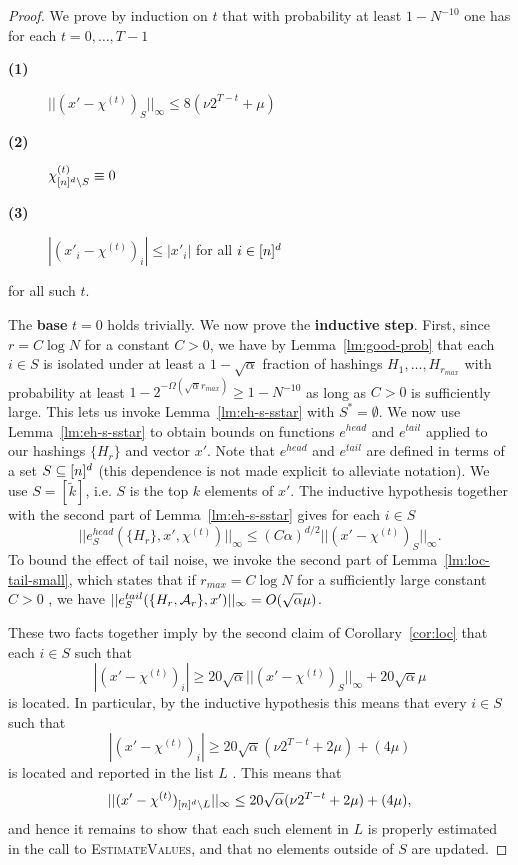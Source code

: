 \begin{proof}
 We prove by induction on $t$ that with probability at least $1-N^{-10}$ one has for each $t=0,\ldots, T-1$
\begin{description}
\item[{\bf (1)}] $||(x'-\chi^{(t)})_S||_\infty\leq 8(\nu 2^{T-t}+\mu)$
\item[{\bf (2)}] $\chi^{(t)}_{{[n]^d}\setminus S}\equiv 0$
\item[{\bf (3)}] $|(x'_i-\chi^{(t)})_i|\leq |x'_i|$ for all $i\in {[n]^d}$
\end{description}
for all such $t$.

The {\bf base} $t=0$ holds trivially. We now prove the {\bf inductive step}. First, since $r=C\log N$ for a constant $C>0$, we have by Lemma~\ref{lm:good-prob} that each $i\in S$ is isolated under at least a $1-\sqrt{\alpha}$ fraction of hashings $H_1,\ldots, H_{r_{max}}$ with probability at least $1-2^{-\Omega(\sqrt{\alpha}r_{max})}\geq 1- N^{-10}$ as long as $C>0$ is sufficiently large. This lets us invoke Lemma~\ref{lm:eh-s-sstar} with $S^*=\emptyset$. We now use Lemma~\ref{lm:eh-s-sstar} to obtain bounds on functions $e^{head}$ and $e^{tail}$ applied to our hashings $\{H_r\}$ and vector $x'$. Note that $e^{head}$ and $e^{tail}$ are defined in terms of a set $S\subseteq {[n]^d}$ (this dependence is not made explicit to alleviate notation). We use $S=[\tilde k]$, i.e. $S$ is the top $k$ elements of $x'$. The inductive hypothesis together with the second part of Lemma~\ref{lm:eh-s-sstar} gives for each $i\in S$ 
$$
||e^{head}_S(\{H_r\}, x', \chi^{(t)})||_\infty\leq (C\alpha)^{d/2} ||(x'-\chi^{(t)})_S||_\infty.
$$
To bound the effect of tail noise, we invoke the second part of Lemma~\ref{lm:loc-tail-small}, which states that if $r_{max}=C\log N$ for a sufficiently large constant $C>0$ , we have
$||e^{tail}_S(\{H_r, {\mathcal{A}}_r\}, x')||_\infty=O(\sqrt{\alpha} \mu)$. 

These two facts together imply by the second claim of Corollary~\ref{cor:loc} that each $i\in S$ such that 
$$
|(x'-\chi^{(t)})_i|\geq 20\sqrt{\alpha} ||(x'-\chi^{(t)})_S||_\infty+20\sqrt{\alpha} \mu
$$
is located. In particular, by the inductive hypothesis this means that every $i\in S$ such that 
$$
|(x'-\chi^{(t)})_i|\geq 20\sqrt{\alpha} (\nu 2^{T-t}+2\mu)+(4\mu)
$$
is located and reported in the list $L$ . This means that 
$$
||(x'-\chi^{(t)})_{{[n]^d}\setminus L}||_\infty\leq 20\sqrt{\alpha} (\nu 2^{T-t}+2\mu)+(4\mu),
$$
and hence it remains to show that each such element in $L$ is properly estimated in the call to \textsc{EstimateValues}, and that no elements outside of $S$ are updated. 


\end{proof}
